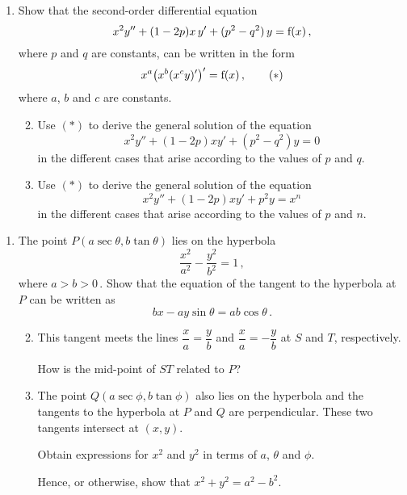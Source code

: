 \documentclass[a4, 11pt]{report}
\newlength{\qspace}
\newcounter{qnumber}
\newenvironment{question}%
 {\vspace{\qspace}
  \begin{enumerate}[\bfseries 1\quad][10]%
    \setcounter{enumi}{\value{qnumber}}%
    \item%
 }
{
  \end{enumerate}
  \filbreak
  \stepcounter{qnumber}
 }
\newenvironment{questionparts}[1][1]%
 {
  \begin{enumerate}[\bfseries (i)]%
    \setcounter{enumii}{#1}
    \addtocounter{enumii}{-1}
    \setlength{\itemsep}{3mm}
    \setlength{\parskip}{8pt}
 }
 {
  \end{enumerate}
 }
\def\f{{\rm f}}
\begin{document}
\begin{question}
Show that
 the second-order differential equation
\[
x^2y''+(1-2p) x\, y' + (p^2-q^2) \, y= \f(x)
\,,
\]
where $p$ and $q$ are constants, can be written in the 
form
\[
x^a  
\big(x^b 
(x^cy)'\big)' = \f(x)
\,,
\tag{$*$}
\]
where $a$, $b$ and $c$ are constants. 

\begin{questionparts}
\item Use $(*)$ to derive the general solution of the equation
\[
x^{2}y''+(1-2p)xy'+(p^2-q^{2})y=0
\]
in the different cases that arise according to the values of $p$ and $q$.

\item Use $(*)$ to derive the general solution of the equation
\[
x^{2}y''+(1-2p)xy'+p^2y=x^{n}
\]
in the different cases that arise according to the values of $p$ and $n$.

\end{questionparts}

\end{question}

\begin{question}
The point $P(a\sec \theta, b\tan \theta )$ 
lies on the hyperbola 
\[
\dfrac{x^{2}}{a^{2}}-\dfrac{y^{2}}{b^{2}}=1\,,
\]
where $a>b>0\,$. 
Show that the equation of the 
tangent to the hyperbola at $P$ can be written as
\[
bx- ay \sin\theta  = 
ab \cos\theta
\,.
\]

\begin{questionparts}
\item This tangent  meets the 
lines
$\dfrac x a = \dfrac yb$ and $\dfrac x a =- \dfrac y b$
at
 $S$ and $T$,
 respectively. 

How is  the mid-point of $ST$
related to $P$?
\item
The point $Q(a\sec \phi, b\tan \phi)$ also lies on the
hyperbola and  the tangents to the 
hyperbola at $P$ and $Q$ 
 are perpendicular.               
These two  tangents intersect at $(x,y)$. 

Obtain expressions for $x^2$ and $y^2$ in terms of $a$, $\theta$ and $\phi$.

Hence, or otherwise,
show that
 $x^2+y^2 = a^2 -b^2$. 
\end{questionparts}
\end{question}



\end{document}
